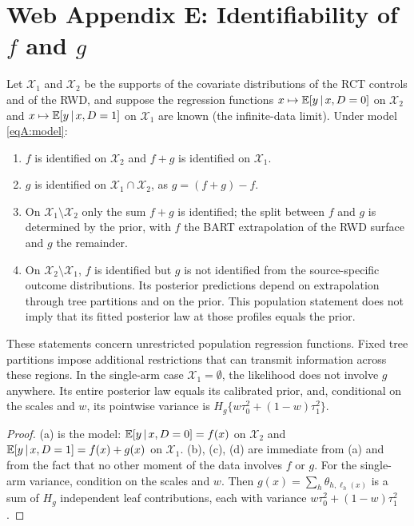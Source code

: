 \section*{Web Appendix E: Identifiability of $f$ and $g$}

\begin{propA}\label{prop:ident}
Let $\mathcal X_1$ and $\mathcal X_2$ be the supports of the covariate distributions of the RCT controls and of the RWD, and suppose the regression functions $x\mapsto\mathbb{E}[y\,\vert\, x,D=0]$ on $\mathcal X_2$ and $x\mapsto\mathbb{E}[y\,\vert\, x,D=1]$ on $\mathcal X_1$ are known (the infinite-data limit). Under model \eqref{eqA:model}:
\begin{enumerate}[label=(\alph*),leftmargin=2.2em]
\item $f$ is identified on $\mathcal X_2$ and $f+g$ is identified on $\mathcal X_1$.
\item $g$ is identified on $\mathcal X_1\cap\mathcal X_2$, as $g=(f+g)-f$.
\item On $\mathcal X_1\setminus\mathcal X_2$ only the sum $f+g$ is identified; the split between $f$ and $g$ is determined by the prior, with $f$ the BART extrapolation of the RWD surface and $g$ the remainder.
\item On $\mathcal X_2\setminus\mathcal X_1$, $f$ is identified but $g$ is not identified from the source-specific outcome distributions. Its posterior predictions depend on extrapolation through tree partitions and on the prior. This population statement does not imply that its fitted posterior law at those profiles equals the prior.
\end{enumerate}
These statements concern unrestricted population regression functions. Fixed tree partitions impose additional restrictions that can transmit information across these regions. In the single-arm case $\mathcal X_1=\emptyset$, the likelihood does not involve $g$ anywhere. Its entire posterior law equals its calibrated prior, and, conditional on the scales and $w$, its pointwise variance is $H_g\{w\tau_0^2+(1-w)\tau_1^2\}$.
\end{propA}

\begin{proof}
(a) is the model: $\mathbb{E}[y\,\vert\, x,D=0]=f(x)$ on $\mathcal X_2$ and $\mathbb{E}[y\,\vert\, x,D=1]=f(x)+g(x)$ on $\mathcal X_1$. (b), (c), (d) are immediate from (a) and from the fact that no other moment of the data involves $f$ or $g$. For the single-arm variance, condition on the scales and $w$. Then $g(x)=\sum_h\theta_{h,\ell_h(x)}$ is a sum of $H_g$ independent leaf contributions, each with variance $w\tau_0^2+(1-w)\tau_1^2$.
\end{proof}

